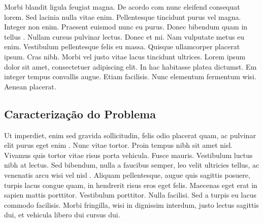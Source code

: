 Morbi blandit ligula feugiat magna. De acordo com  \citet{Soares2013} nunc eleifend consequat lorem. Sed lacinia nulla vitae enim. Pellentesque tincidunt purus vel magna. Integer non enim. Praesent euismod nunc eu purus. Donec bibendum quam in tellus \citep{Yoko2003}. Nullam cursus pulvinar lectus. Donec et mi. Nam vulputate metus eu enim. Vestibulum pellentesque felis eu massa. Quisque ullamcorper placerat ipsum. Cras nibh. Morbi vel justo vitae lacus tincidunt ultrices. Lorem ipsum dolor sit amet, consectetuer adipiscing elit. In hac habitasse platea dictumst. Em \citet{Dias2013} integer tempus convallis augue. Etiam facilisis. Nunc elementum fermentum wisi. Aenean placerat.

\subsection{Caracteriza\c{c}\~{a}o do Problema}
Ut imperdiet, enim sed gravida sollicitudin, felis odio placerat quam, ac pulvinar elit purus eget enim \citep{Gubitoso1992}. Nunc vitae tortor. Proin tempus nibh sit amet nisl. Vivamus quis tortor vitae risus porta vehicula. Fusce mauris. Vestibulum luctus nibh at lectus. Sed bibendum, nulla a faucibus semper, leo velit ultricies tellus, ac venenatis arcu wisi vel nisl \citep{icse2015}. Aliquam pellentesque, augue quis sagittis posuere, turpis lacus congue quam, in hendrerit risus eros eget felis. Maecenas eget erat in sapien mattis porttitor. Vestibulum porttitor. Nulla facilisi. Sed a turpis eu lacus commodo facilisis. Morbi fringilla, wisi in dignissim interdum, justo lectus sagittis dui, et vehicula libero dui cursus dui.

